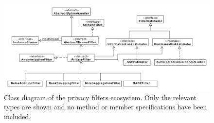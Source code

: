\begin{figure}
	\centering
	\includegraphics[width=1.0\textwidth]{figures/refactored-ppsm-class-diagram.pdf}
	\caption[Class diagram of the privacy filters ecosystem.]{Class diagram of the privacy filters ecosystem. Only the relevant types are shown and no method or member specifications have been included.}
	\label{fig:moa-ppsm-class-uml}
\end{figure}